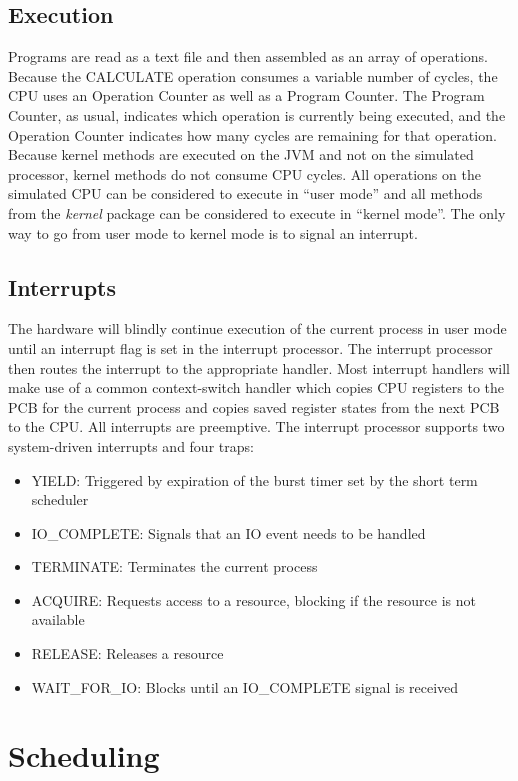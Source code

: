 \documentclass[paper=a4, fontsize=11pt]{scrartcl} %
\numberwithin{equation}{section} %
\numberwithin{figure}{section} %
\numberwithin{table}{section} %
\begin{document}
\subsection{Execution}
Programs are read as a text file and then assembled as an array of operations. Because the CALCULATE operation consumes a variable number of cycles, the CPU uses an Operation Counter as well as a Program Counter. The Program Counter, as usual, indicates which operation is currently being executed, and the Operation Counter indicates how many cycles are remaining for that operation.
Because kernel methods are executed on the JVM and not on the simulated processor, kernel methods do not consume CPU cycles. All operations on the simulated CPU can be considered to execute in ``user mode'' and all methods from the \textit{kernel} package can be considered to execute in ``kernel mode''. The only way to go from user mode to kernel mode is to signal an interrupt.

\subsection{Interrupts}

The hardware will blindly continue execution of the current process in user mode until an interrupt flag is set in the interrupt processor. The interrupt processor then routes the interrupt to the appropriate handler. Most interrupt handlers will make use of a common context-switch handler which copies CPU registers to the PCB for the current process and copies saved register states from the next PCB to the CPU. All interrupts are preemptive. The interrupt processor supports two system-driven interrupts and four traps:


\begin{itemize}
	\item YIELD: Triggered by expiration of the burst timer set by the short term scheduler
          \item IO\_COMPLETE: Signals that an IO event needs to be handled
           \item TERMINATE: Terminates the current process
	\item ACQUIRE: Requests access to a resource, blocking if the resource is not available
	\item RELEASE: Releases a resource
	\item WAIT\_FOR\_IO: Blocks until an IO\_COMPLETE signal is received
\end{itemize}

\section{Scheduling}
\end{document}
